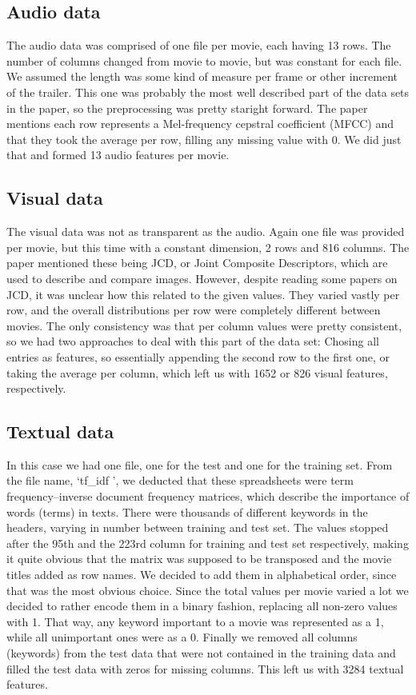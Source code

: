 \documentclass[sigconf]{acmart}
\begin{document}
\subsection{Audio data}
The audio data was comprised of one file per movie, each having 13 rows. The number of columns changed from movie to movie, but was constant for each file. We assumed the length was some kind of measure per frame or other increment of the trailer. This one was probably the most well described part of the data sets in the paper, so the preprocessing was pretty staright forward. The paper mentions each row represents a Mel-frequency cepstral coefficient (MFCC) and that they took the average per row, filling any missing value with 0. We did just that and formed 13 audio features per movie.

\subsection{Visual data}
The visual data was not as transparent as the audio. Again one file was provided per movie, but this time with a constant dimension, 2 rows and 816 columns. The paper mentioned these being JCD, or Joint Composite Descriptors, which are used to describe and compare images. However, despite reading some papers on JCD, it was unclear how this related to the given values. They varied vastly per row, and the overall distributions per row were completely different between movies. The only consistency was that per column values were pretty consistent, so we had two approaches to deal with this part of the data set: Chosing all entries as features, so essentially appending the second row to the first one, or taking the average per column, which left us with 1652 or 826 visual features, respectively.

\subsection{Textual data}
In this case we had one file, one for the test and one for the training set. From the file name, \lq tf\_idf \rq, we deducted that these spreadsheets were term frequency–inverse document frequency matrices, which describe the importance of words (terms) in texts. There were thousands of different keywords in the headers, varying in number between training and test set. The values stopped after the 95th and the 223rd column for training and test set respectively, making it quite obvious that the matrix was supposed to be transposed and the movie titles added as row names. We decided to add them in alphabetical order, since that was the most obvious choice. Since the total values per movie varied a lot we decided to rather encode them in a binary fashion, replacing all non-zero values with 1. That way, any keyword important to a movie was represented as a 1, while all unimportant ones were as a 0. Finally we removed all columns (keywords) from the test data that were not contained in the training data and filled the test data with zeros for missing columns. This left us with 3284 textual features.
\end{document}
